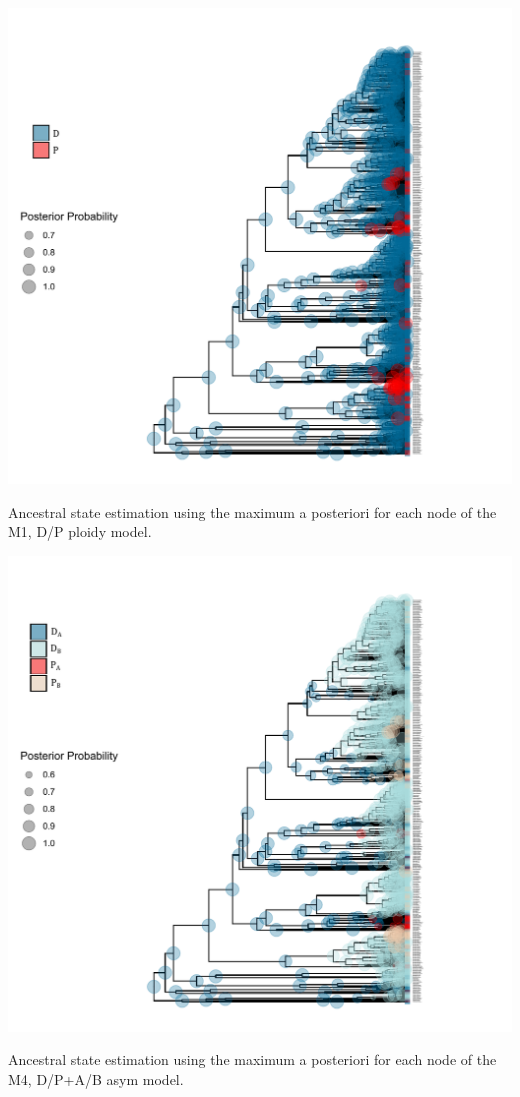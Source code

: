 \begin{suppfigure}
\includegraphics[width=\textwidth]{asrDP.pdf}
\caption{Ancestral state estimation using the maximum a posteriori for each node of the M1, D/P ploidy model. } %
\label{suppfigure:DPnodipasr}
\end{suppfigure}



\begin{suppfigure}
\includegraphics[width=\textwidth]{asrDPAB.pdf}
\caption{Ancestral state estimation using the maximum a posteriori for each node of the M4, D/P+A/B asym model.} %
\label{suppfigure:DPnodipABasr}
\end{suppfigure}


